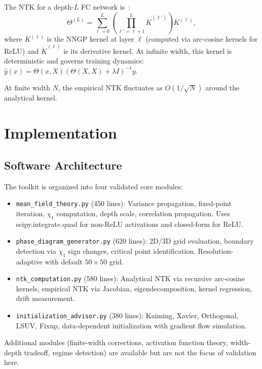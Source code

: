 \documentclass[10pt]{article}
\theoremstyle{definition}
\begin{document}
The NTK for a depth-$L$ FC network is~\citep{jacot2018neural}:
\begin{equation}
  \Theta^{(L)} = \sum_{\ell=0}^{L} \left(\prod_{\ell'=\ell+1}^{L} \dot{K}^{(\ell')}\right) K^{(\ell)},
  \label{eq:ntk}
\end{equation}
where $K^{(\ell)}$ is the NNGP kernel at layer $\ell$ (computed via arc-cosine kernels for ReLU) and $\dot{K}^{(\ell)}$ is its derivative kernel.
At infinite width, this kernel is deterministic and governs training dynamics:
$\hat{y}(x) = \Theta(x, X)(\Theta(X,X) + \lambda I)^{-1} y$.

At finite width $N$, the empirical NTK fluctuates as $O(1/\sqrt{N})$ around the analytical kernel.

\section{Implementation}
\label{sec:implementation}

\subsection{Software Architecture}

The toolkit is organized into four validated core modules:
\begin{itemize}[nosep]
  \item \texttt{mean\_field\_theory.py} (450 lines): Variance propagation, fixed-point iteration, $\chi_1$ computation, depth scale, correlation propagation. Uses scipy.integrate.quad for non-ReLU activations and closed-form for ReLU.
  \item \texttt{phase\_diagram\_generator.py} (620 lines): 2D/3D grid evaluation, boundary detection via $\chi_1$ sign changes, critical point identification. Resolution-adaptive with default $50 \times 50$ grid.
  \item \texttt{ntk\_computation.py} (580 lines): Analytical NTK via recursive arc-cosine kernels, empirical NTK via Jacobian, eigendecomposition, kernel regression, drift measurement.
  \item \texttt{initialization\_advisor.py} (380 lines): Kaiming, Xavier, Orthogonal, LSUV, Fixup, data-dependent initialization with gradient flow simulation.
\end{itemize}

Additional modules (finite-width corrections, activation function theory, width-depth tradeoff, regime detection) are available but are not the focus of validation here.
\end{document}
